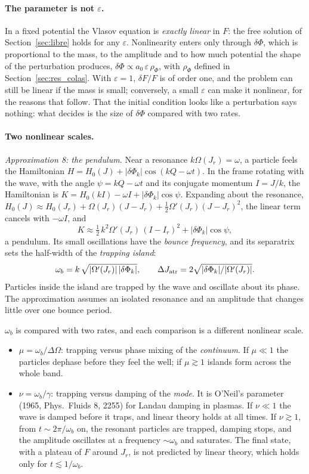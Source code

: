 \documentclass[11pt,a4paper]{article}
\begin{document}
\paragraph{The parameter is not $\varepsilon$.} In a fixed potential the Vlasov equation is
\emph{exactly linear} in $F$: the free solution of Section~\ref{sec:libre} holds for any
$\varepsilon$. Nonlinearity enters only through $\delta\Phi$, which is proportional to the mass,
to the amplitude and to how much potential the shape of the perturbation produces,
$\delta\Phi\propto a_0\,\varepsilon\,\rho_\Phi$, with $\rho_\Phi$ defined in Section~\ref{sec:res_colas}. With
$\varepsilon=1$, $\delta F/F$ is of order one, and the problem can still be linear if the mass is
small; conversely, a small $\varepsilon$ can make it nonlinear, for the reasons that follow.
That the initial condition looks like a perturbation says nothing: what decides is the
size of $\delta\Phi$ compared with two rates.

\paragraph{Two nonlinear scales.} \emph{Approximation 8: the pendulum.} Near a resonance
$k\Omega(J_r)=\omega$, a particle feels the Hamiltonian $H=H_0(J)+|\delta\Phi_k|\cos(kQ-\omega t)$. In
the frame rotating with the wave, with the angle $\psi=kQ-\omega t$ and its conjugate momentum
$I=J/k$, the Hamiltonian is $K=H_0(kI)-\omega I+|\delta\Phi_k|\cos\psi$. Expanding about the
resonance, $H_0(J)\approx H_0(J_r)+\Omega(J_r)(J-J_r)+\tfrac12\Omega'(J_r)(J-J_r)^2$, the linear term
cancels with $-\omega I$, and
\[
  K \approx \tfrac12\,k^2\Omega'(J_r)\,(I-I_r)^2 + |\delta\Phi_k|\cos\psi ,
\]
a pendulum. Its small oscillations have the \emph{bounce frequency}, and its separatrix sets
the half-width of the \emph{trapping island}:
\[
  \omega_b = k\,\sqrt{|\Omega'(J_r)|\,|\delta\Phi_k|}, \qquad
  \Delta J_{\rm atr} = 2\sqrt{|\delta\Phi_k|/|\Omega'(J_r)|}.
\]
Particles inside the island are trapped by the wave and oscillate about its phase. The
approximation assumes an isolated resonance and an amplitude that changes little over
one bounce period.

$\omega_b$ is compared with two rates, and each comparison is a different nonlinear scale.
\begin{itemize}
\item $\mu=\omega_b/\Delta\Omega$: trapping versus phase mixing of the \emph{continuum}. If $\mu\ll1$
the particles dephase before they feel the well; if $\mu\gtrsim1$ islands form across the
whole band.
\item $\nu=\omega_b/\gamma$: trapping versus damping of the \emph{mode}. It is O'Neil's parameter
(1965, Phys.\ Fluids 8, 2255) for Landau damping in plasmas. If $\nu\ll1$ the wave is damped
before it traps, and linear theory holds at all times. If $\nu\gtrsim1$, from
$t\sim2\pi/\omega_b$ on, the resonant particles are trapped, damping stops, and the amplitude
oscillates at a frequency $\sim\omega_b$ and saturates. The final state, with a plateau of $F$
around $J_r$, is not predicted by linear theory, which holds only for $t\lesssim1/\omega_b$.
\end{itemize}
\end{document}
